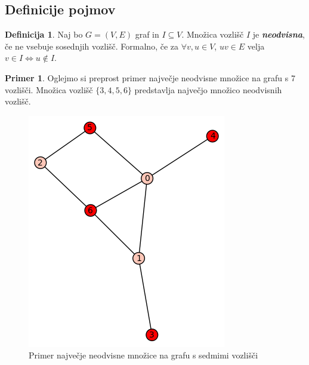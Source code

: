 \documentclass[a4paper, 12 pt]{article}
\theoremstyle{definition}
\newtheorem*{definicija}{Definicija}
\newtheorem*{primer}{Primer}
\theoremstyle{plain}
\theoremstyle{remark}
\begin{document}

\subsection{Definicije pojmov}

\begin{definicija}Naj bo $G = (V, E)$ graf in $I \subseteq V$. Množica vozlišč $I$ je \textbf{\textit{neodvisna}}, če ne vsebuje sosednjih vozlišč. 
\newline Formalno, če za $\forall v, u \in V$, $uv \in E$ velja $v \in I \Leftrightarrow  u \notin I$.
\end{definicija}

\begin{primer}
Oglejmo si preprost primer največje neodvisne množice na grafu s 7 vozlišči. Množica vozlišč $\{3, 4, 5, 6\}$ predstavlja največjo množico neodvisnih vozlišč.
\begin{figure}[H]
\centering
  \includegraphics[scale=0.4]{neodvisna_zgled.png}
  \caption{Primer največje neodvisne množice na grafu s sedmimi vozlišči}
  \label{fig:primer7vozlisc} 
\end{figure}
\end{primer}
\end{document}
